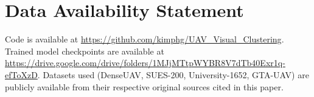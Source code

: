 \documentclass[conference]{IEEEtran}
\begin{document}
\section*{Data Availability Statement}
Code is available at
\url{https://github.com/kimphg/UAV_Visual_Clustering}. Trained model
checkpoints are available at
\url{https://drive.google.com/drive/folders/1MJjMTtpWYBR8V7dTb40Exr1q-efToXzD}.
Datasets used (DenseUAV, SUES-200, University-1652, GTA-UAV) are publicly
available from their respective original sources cited in this paper.



\end{document}
